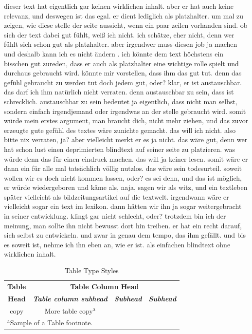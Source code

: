 \documentclass[conference]{IEEEtran}
\begin{document}
dieser text hat eigentlich gar keinen wirklichen inhalt. aber er hat auch keine relevanz, und deswegen ist das egal. er dient lediglich als platzhalter. um mal zu zeigen, wie diese stelle der seite aussieht, wenn ein paar zeilen vorhanden sind. ob sich der text dabei gut fühlt, weiß ich nicht. ich schätze, eher nicht, denn wer fühlt sich schon gut als platzhalter. aber irgendwer muss diesen job ja machen und deshalb kann ich es nicht ändern . ich könnte dem text höchstens ein bisschen gut zureden, dass er auch als platzhalter eine wichtige rolle spielt und durchaus gebraucht wird. könnte mir vorstellen, dass ihm das gut tut. denn das gefühl gebraucht zu werden tut doch jedem gut, oder? klar, er ist austauschbar. das darf ich ihm natürlich nicht verraten. denn austauschbar zu sein, dass ist schrecklich. austauschbar zu sein bedeutet ja eigentlich, dass nicht man selbst, sondern einfach irgendjemand oder irgendwas an der stelle gebraucht wird. somit würde mein erstes argument, man braucht dich, nicht mehr ziehen, und das zuvor erzeugte gute gefühl des textes wäre zunichte gemacht. das will ich nicht. also bitte nix verraten, ja? aber vielleicht merkt er es ja nicht. das wäre gut, denn wer hat schon lust einen deprimierten blindtext auf seiner seite zu platzieren. was würde denn das für einen eindruck machen. das will ja keiner lesen. somit wäre er dann ein für alle mal tatsächlich völlig nutzlos. das wäre sein todesurteil. soweit wollen wir es doch nicht kommen lassen, oder? es sei denn, und das ist möglich, er würde wiedergeboren und käme als, naja, sagen wir als witz, und ein textleben später vielleicht als bildzeitungsartikel auf die textwelt. irgendwann wäre er vielleicht sogar ein text im lexikon. dann hätten wir ihn ja sogar weitergebracht in seiner entwicklung. klingt gar nicht schlecht, oder? trotzdem bin ich der meinung, man sollte ihn nicht bewusst dort hin treiben. er hat ein recht darauf, sich selbst zu entwickeln. und zwar in genau dem tempo, das ihm gefällt. und bis es soweit ist, nehme ich ihn eben an, wie er ist. als einfachen blindtext ohne wirklichen inhalt.

\begin{table}[htbp]
\caption{Table Type Styles}
\begin{center}
\begin{tabular}{|c|c|c|c|}
\hline
\textbf{Table}&\multicolumn{3}{|c|}{\textbf{Table Column Head}} \\
\cline{2-4} 
\textbf{Head} & \textbf{\textit{Table column subhead}}& \textbf{\textit{Subhead}}& \textbf{\textit{Subhead}} \\
\hline
copy& More table copy$^{\mathrm{a}}$& &  \\
\hline
\multicolumn{4}{l}{$^{\mathrm{a}}$Sample of a Table footnote.}
\end{tabular}
\label{tab1}
\end{center}
\end{table}
\end{document}
